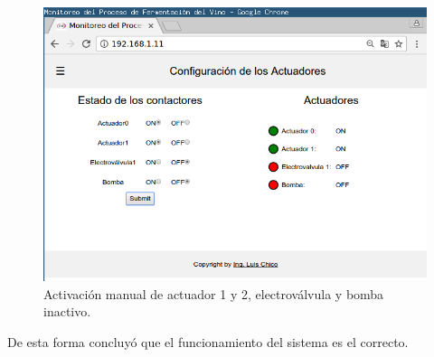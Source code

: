 \begin{figure}[h]
  \centering
  \includegraphics[scale=.4]{./Figures/test_contact.png}
  \caption{Activación manual de actuador 1 y 2, electroválvula y bomba inactivo.}
  \label{fig:test_contact}
\end{figure}


De esta forma concluyó que el funcionamiento del sistema es el correcto.


